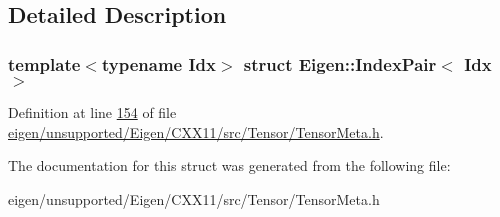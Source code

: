 \subsection{Detailed Description}
\subsubsection*{template$<$typename Idx$>$\newline
struct Eigen\+::\+Index\+Pair$<$ Idx $>$}



Definition at line \hyperlink{eigen_2unsupported_2_eigen_2_c_x_x11_2src_2_tensor_2_tensor_meta_8h_source_l00154}{154} of file \hyperlink{eigen_2unsupported_2_eigen_2_c_x_x11_2src_2_tensor_2_tensor_meta_8h_source}{eigen/unsupported/\+Eigen/\+C\+X\+X11/src/\+Tensor/\+Tensor\+Meta.\+h}.



The documentation for this struct was generated from the following file\+:\begin{DoxyCompactItemize}
\item 
eigen/unsupported/\+Eigen/\+C\+X\+X11/src/\+Tensor/\+Tensor\+Meta.\+h\end{DoxyCompactItemize}
